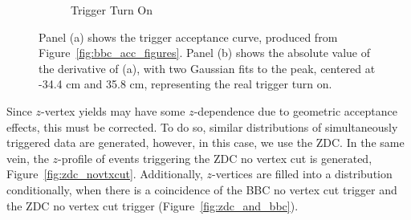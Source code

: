\begin{figure}
\begin{subfigure}[b]{0.7\linewidth}
    \caption{Trigger Turn On}
    \label{fig:acceptance_turn_on}
  \end{subfigure}
  \caption{
    Panel (a) shows the trigger acceptance curve, produced from
    Figure~\ref{fig:bbc_acc_figures}. Panel (b) shows the absolute
    value of the derivative of (a), with two Gaussian fits to the peak, centered
    at -34.4 cm and 35.8 cm, representing the real trigger turn on.
  }
  \label{fig:acceptance_bbc}
\end{figure}

Since $z$-vertex yields may have some $z$-dependence due to geometric acceptance
effects, this must be corrected. To do so, similar distributions of
simultaneously triggered data are generated, however, in this case, we use the
ZDC. In the same vein, the $z$-profile of events triggering the ZDC no vertex
cut is generated, Figure~\ref{fig:zdc_novtxcut}. Additionally, $z$-vertices are
filled into a distribution conditionally, when there is a coincidence of the BBC
no vertex cut trigger and the ZDC no vertex cut trigger
(Figure~\ref{fig:zdc_and_bbc}).

